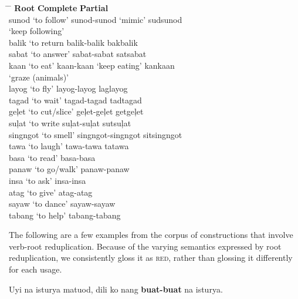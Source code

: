 \ea
\label{ex:following}
\begin{tabbing}
\hspace{3.6cm} \= \hspace{4.3cm} \= \kill
\textbf{Root} \> \textbf{Complete} \> \textbf{Partial} \\
sunod ‘to follow’ \> sunod-sunod ‘mimic’ \> sudsunod \\
\> \> ‘keep following’ \\
balik ‘to return \> balik-balik \> bakbalik \\
sabat ‘to answer’ \> sabat-sabat \> satsabat \\
kaan ‘to eat’ \> kaan-kaan ‘keep eating’ \> kankaan \\
\> \> ‘graze (animals)’ \\
layog ‘to fly’ \> layog-layog \> laglayog \\
tagad ‘to wait’ \> tagad-tagad \> tadtagad \\
geļet ‘to cut/slice’ \> geļet-geļet \> getgeļet \\
suļat ‘to write \> suļat-suļat \> sutsuļat \\
singngot ‘to smell’ \> singngot-singngot \> sitsingngot \\
tawa ‘to laugh’ \> tawa-tawa \> tatawa \\
basa ‘to read’ \> basa-basa \\
panaw ‘to go/walk’ \> panaw-panaw \\
insa ‘to ask’ \> insa-insa \\
atag ‘to give’ \> atag-atag \\
sayaw ‘to dance’ \> sayaw-sayaw \\
tabang ‘to help’ \> tabang-tabang
\end{tabbing}
\z

The following are a few examples from the corpus of constructions that involve verb-root reduplication. Because of the varying semantics expressed by root reduplication, we consistently gloss it as \textsc{red,} rather than glossing it differently for each usage.

\ea
\label{bkm:Ref361055761}
Uyi  na  isturya  matuod,  dili  ko  nang  \textbf{buat-buat}  na  isturya. \\\smallskip

